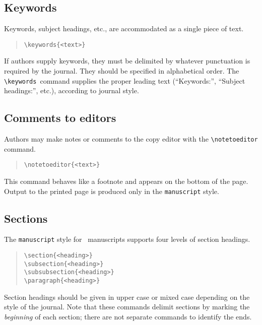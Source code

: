 \documentclass[preprint2]{aastex}
\begin{document}
\subsection{Keywords} 
 
Keywords, subject headings, etc., are accommodated 
as a single piece of text. 
\begin{quote} 
\begin{verbatim} 
\keywords{<text>} 
\end{verbatim} 
\end{quote} 
If authors supply keywords, they must be delimited by whatever 
punctuation is required by the journal. 
They should be specified in alphabetical order. 
The \verb"\keywords"\ 
 command 
supplies the proper leading text (``Keywords:'', ``Subject headings:'', 
etc.), according to journal style. 
 
\subsection{Comments to editors} 
 
Authors may make notes or comments to the copy editor with the 
\verb"\notetoeditor" command. 
\begin{quote} 
\begin{verbatim} 
\notetoeditor{<text>} 
\end{verbatim} 
\end{quote} 
This command behaves like a 
footnote and appears on the bottom of the page. 
Output to the printed page is produced only in the 
\texttt{manuscript} style. 
 
\subsection{Sections} 
 
The \texttt{manuscript} style for \aastex\ manuscripts supports four levels 
of section headings. 
\begin{quote} 
\begin{verbatim} 
\section{<heading>} 
\subsection{<heading>} 
\subsubsection{<heading>} 
\paragraph{<heading>} 
\end{verbatim} 
\end{quote} 
Section headings should be given in upper case or mixed case depending 
on the style of the journal. 
Note that these commands delimit sections by marking the 
\emph{beginning} of each section; 
there are not separate commands to identify the ends. 
 
\end{document}
